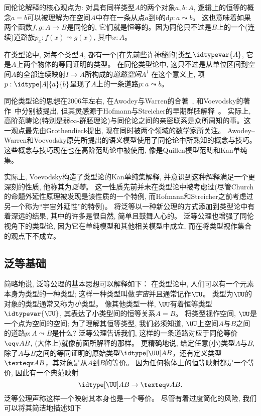 同伦论解释的核心观点为: 对具有同样类型$A$的两个对象$a, b:A$,  逻辑上的恒等的概念$a=b$可以被理解为在空间$A$中存在一条从点$a$到$b$的d$p : a \leadsto b$。
这也意味着如果两个函数$f, g: A \to B$是同伦的, 它们就是恒等的。因为同伦只不过是$B$上的一个(连续)道路族$p_x: f(x) \leadsto g(x)$, 其中$x:A$。

在类型论中, 对每个类型$A$, 都有一个(在先前些许神秘的)类型$\idtypevar{A}$, 它是$A$上两个物体的等同证明的类型。
在同伦类型论中, 这只不过是从单位区间到空间$A$的全部连续映射$I \to A$所构成的\emph{道路空间}$A^I$
%
%
%
%
在这个意义上, 项$p : \idtype[A]{a}{b}$呈现了$A$上的一条道路$p : a \leadsto b$。

同伦类型论的思想在2006年左右, 在Awodey与Warren的合著~\cite{AW}, 和Voevodsky的著作~\cite{VV}中分别被提出,  
但其灵感源于Hofmann与Streicher的早期群胚解释~\cite{hs:gpd-typethy}。
实际上, 高阶范畴论(特别是弱$\infty$-群胚理论)与同伦论之间的亲密联系是众所周知的事。这一观点最先由Grothendieck提出, 现在同时被两个领域的数学家所关注。
Awodey--Warren和Voevodsky原先所提出的语义模型使用了同伦论中所熟知的概念与技巧。这些概念与技巧现在也在高阶范畴论中被使用, 
像是Quillen模型范畴和Kan单纯集。
%
%

实际上, Voevodsky构造了类型论的Kan单纯集解释, 并意识到这种解释满足一个更深刻的性质, 他称其为\emph{泛等}。
这一性质先前并未在类型论中被考虑过(尽管Church的命题外延性原理被发现是该性质的一个特例, 而Hofmann和Streicher之前考虑过另一个称为``宇宙外延性''的特例)。
将泛等以一种新公理的方式添加到类型论中有着深远的结果, 其中的许多是很自然, 简单且鼓舞人心的。
泛等公理也增强了同伦视角下的类型论, 因为它在单纯模型和其他相关模型中成立, 而在将类型视作集合的观点下不成立。

\subsection*{泛等基础}

简略地说, 泛等公理的基本思想可以解释如下：
在类型论中, 人们可以有一个元素本身为类型的一种类型; 这样一种类型叫做\emph{宇宙}并且通常记作$\UU$。
类型为$\UU$的对象的类型通常又称为\emph{小}类型。
%
%
像其他类型一样, $\UU$有着恒等类型$\idtypevar{\UU}$, 其表达了小类型间的恒等关系$A=B$。
将类型视作空间, $\UU$是一个点为空间的空间; 为了理解其恒等类型, 我们必须知道, $\UU$上空间$A$与$B$之间的道路$p: A \leadsto B$是什么?
泛等公理告诉我们, 这样的一条道路对应于同伦等价$\eqv A B$,  (大体上)就像前面所解释的那样。
更精确地说, 给定任意(小)类型$A$与$B$, 除了$A$与$B$之间的等同证明的原始类型$\idtype[\UU]AB$，还有定义类型$\texteqv AB$，其对象是从$A$到$B$的等价。
因为任何物体上的恒等映射都是一个等价, 因此有一个典范映射
\[\idtype[\UU]AB\to\texteqv AB.\]
泛等公理声称这样一个映射其本身也是一个等价。
尽管有着过度简化的风险, 我们可以将其简洁地描述如下

